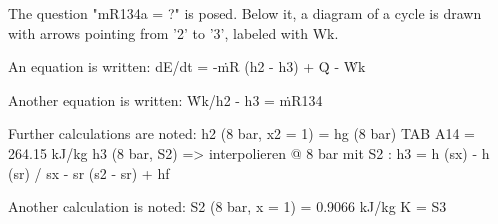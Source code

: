 The question "mR134a = ?" is posed. Below it, a diagram of a cycle is drawn with arrows pointing from '2' to '3', labeled with Wk. 

An equation is written:
dE/dt = -ṁR (h2 - h3) + Q̇ - Ẇk

Another equation is written:
Ẇk/h2 - h3 = ṁR134

Further calculations are noted:
h2 (8 bar, x2 = 1) = hg (8 bar) TAB A14 = 264.15 kJ/kg
h3 (8 bar, S2) => interpolieren @ 8 bar mit S2 : h3 = h (sx) - h (sr) / sx - sr (s2 - sr) + hf

Another calculation is noted:
S2 (8 bar, x = 1) = 0.9066 kJ/kg K = S3